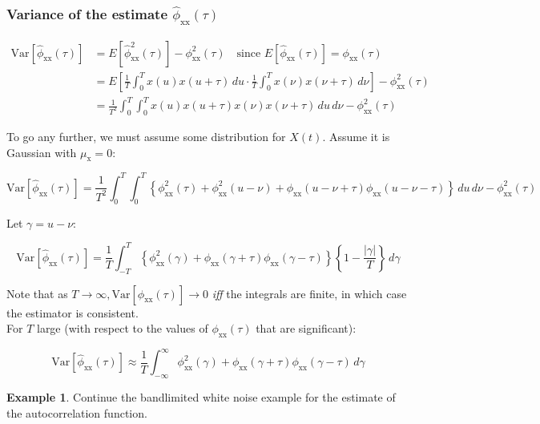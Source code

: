 \documentclass[12pt]{book}
\theoremstyle{definition}
\newtheorem{exmp}{Example}[chapter]
\begin{document}
\subsubsection*{Variance of the estimate \( \hat{\phi}_\mathrm{xx} (\tau) \)}
\[
\begin{aligned}
    \text{Var}[\hat{\phi}_\mathrm{xx} (\tau)] & = E \left [ \hat{\phi}^2_\mathrm{xx} (\tau) \right ] - \phi^2_\mathrm{xx} (\tau) \quad \text{since } E\left [ \hat{\phi}_\mathrm{xx} (\tau) \right ] = \phi_\mathrm{xx}  (\tau) \\
    & = E \left [ \frac{1}{T} \int_0^T x(u) x(u+\tau) \, du \cdot \frac{1}{T} \int_0^T x(\nu) x(\nu+\tau) \, d \nu\right ] - \phi^2_\mathrm{xx} (\tau) \\
    & = \frac{1}{T^2} \int_0^T \int_0^T x(u) x(u+\tau) x(\nu) x(\nu+\tau) \, du \, d \nu - \phi^2_\mathrm{xx} (\tau)
\end{aligned}
\]

To go any further, we must assume some distribution for \(X(t)\). Assume it is Gaussian with \(\mu_\mathrm{x} = 0\):

\[
    \text{Var}[\hat{\phi}_\mathrm{xx} (\tau)] = \frac{1}{T^2} \int_0^T \int_0^T \left \{ \phi^2_\mathrm{xx} (\tau) + \phi^2_\mathrm{xx} (u - \nu) + \phi_\mathrm{xx} (u - \nu + \tau) \phi_\mathrm{xx} (u - \nu - \tau) \right \}   \, du \, d \nu  - \phi^2_\mathrm{xx} (\tau)
\]

Let \(\gamma = u - \nu\):

\[
    \text{Var}[\hat{\phi}_\mathrm{xx} (\tau)] = \frac{1}{T} \int_{-T}^T \left \{ \phi^2_\mathrm{xx} (\gamma) + \phi_\mathrm{xx} (\gamma + \tau) \phi_\mathrm{xx} (\gamma - \tau) \right \} \left \{ 1 - \frac{|\gamma|}{T}\right \} \, d \gamma
\]

Note that as \(T \rightarrow \infty, \text{Var}[\hat{\phi}_\mathrm{xx} (\tau)] \rightarrow 0\) \emph{iff} the integrals are finite, in which case the estimator is consistent.\\

For \(T\) large (with respect to the values of \(\phi_\mathrm{xx} (\tau) \) that are significant): 

\[
    \text{Var}[\hat{\phi}_\mathrm{xx} (\tau)] \approx \frac{1}{T} \int_{-\infty}^\infty  \phi^2_\mathrm{xx} (\gamma) + \phi_\mathrm{xx} (\gamma + \tau) \phi_\mathrm{xx} (\gamma - \tau)  \, d \gamma
\]

\begin{tcolorbox}
    \begin{exmp}{Continue the bandlimited white noise example for the estimate of the autocorrelation function.}
   
    \end{exmp}
\end{tcolorbox}
\end{document}
